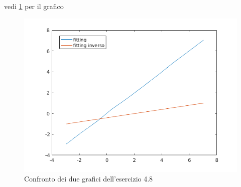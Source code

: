 
vedi \ref{fitting} per il grafico
\begin{figure}
\centering
\includegraphics[width=\textwidth]{cap_4/es10/untitled}
\caption{Confronto dei due grafici dell'esercizio 4.8}
\label{fitting}
\end{figure}